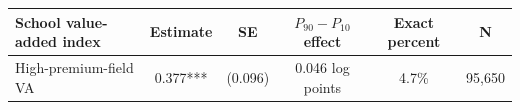 \begin{tabular}{lccccc}
\toprule
School value-added index & Estimate & SE & $P_{90}-P_{10}$ effect & Exact percent & N \\
\midrule
High-premium-field VA & 0.377*** & (0.096) & 0.046 log points & 4.7\% & 95,650 \\
\bottomrule
\end{tabular}
